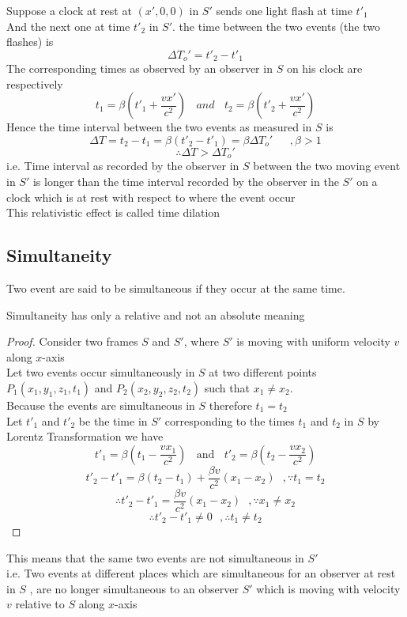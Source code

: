 Suppose a clock at rest at $(x',0,0)$ in $S'$ 
sends one light flash at time $t'_1$\\
And the next one at time $t'_2$ in $S'$. the time between the two events (the two flashes) is 
\[
\Delta T_o' = t'_2 - t'_1
\]
The corresponding times as observed by an observer in $S$ on his clock are respectively
\[
t_1 = \beta\left(t'_1 + \frac{vx'}{c^2}\right) \ \ \ \ and  \ \ \ \ t_2 = \beta\left(t'_2 + \frac{vx'}{c^2}\right)
\]
Hence the time interval between the two events as measured in $S$ is 
\[
\Delta T = t_2-t_1 = \beta (t'_2-t'_1) = \beta\Delta T_o' \ \ \ \ \ \ \ ,\beta>1
\]
\[
\therefore \Delta T > \Delta T_o'
\]
i.e. Time interval as recorded by the observer in $S$ between the two moving event in $S'$ is longer than the time interval recorded by the observer in the $S'$
on a clock which is at rest with respect to where the event occur \\
This relativistic effect is called time dilation

\subsection{Simultaneity}
\hfill
\begin{definition}
    Two event are said to be simultaneous if they occur at the same time.    
\end{definition}
\begin{theorem}
    Simultaneity has only a relative and not an absolute meaning
\end{theorem}
\begin{proof}
Consider two frames $S$ and $S'$, where $S'$ is moving with uniform velocity $v$ along $x$-axis\\
Let two events occur simultaneously in $S$ at two different points $P_1(x_1,y_1,z_1,t_1)$ and $P_2(x_2,y_2,z_2,t_2)$
such that $x_1 \neq x_2 $.\\
Because the events are simultaneous in $S$ therefore $t_1=t_2$\\
Let $t'_1$ and $t'_2$ be the time in $S'$ corresponding to the times $t_1$ and $t_2$ in $S$ by Lorentz Transformation we have 
\[
    t'_1 = \beta\left(t_1 - \frac{vx_1}{c^2}\right) \ \ \ \ \text{and}  \ \ \ \ t'_2 = \beta\left(t_2 - \frac{vx_2}{c^2}\right)
\]
\[
t'_2 -t'_1 = \beta(t_2-t_1) + \frac{\beta v}{c^2}(x_1-x_2) \ \ \ ,\because t_1=t_2
\]
\[
\therefore t'_2 -t'_1 = \frac{\beta v}{c^2}(x_1-x_2) \ \ \ ,\because x_1 \neq x_2
\]
\[
\therefore t'_2 -t'_1 \neq 0  \ \ \ ,\therefore t_1 \neq t_2
\]
\end{proof}
This means that the same two events are not simultaneous in $S'$\\
i.e. Two events at different places which are simultaneous for an observer at rest in $S$ , are no longer simultaneous to an observer $S'$ which is moving with velocity $v$ relative to $S$ along $x$-axis


